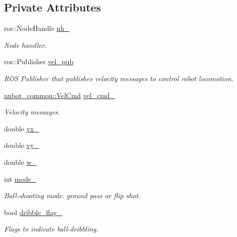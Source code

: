 \subsection*{Private Attributes}
\begin{DoxyCompactItemize}
\item 
ros\-::\-Node\-Handle \hyperlink{classnubot_1_1NubotTeleopKey_aa0685c9872576f6ce3b19b6f467e5cee}{nh\-\_\-}
\begin{DoxyCompactList}\small\item\em Node handler. \end{DoxyCompactList}\item 
ros\-::\-Publisher \hyperlink{classnubot_1_1NubotTeleopKey_af2b940ed562da027c7eda729403e4f86}{vel\-\_\-pub}
\begin{DoxyCompactList}\small\item\em R\-O\-S Publisher that publishes velocity messages to control robot locomotion. \end{DoxyCompactList}\item 
\hyperlink{namespacenubot__common_a7dcbb6e0f9d7827fd3a4c5b347ae3cfa}{nubot\-\_\-common\-::\-Vel\-Cmd} \hyperlink{classnubot_1_1NubotTeleopKey_a7c70e3f5f30f940e9c508deb84f23da5}{vel\-\_\-cmd\-\_\-}
\begin{DoxyCompactList}\small\item\em Velocity messages. \end{DoxyCompactList}\item 
double \hyperlink{classnubot_1_1NubotTeleopKey_aafe296ec15a99f249180144842c64b29}{vx\-\_\-}
\item 
double \hyperlink{classnubot_1_1NubotTeleopKey_a9bd6bb13fc993a07fb3d2272d3e2a600}{vy\-\_\-}
\item 
double \hyperlink{classnubot_1_1NubotTeleopKey_a40143b187fb9f6278b0c2847acd3d756}{w\-\_\-}
\item 
int \hyperlink{classnubot_1_1NubotTeleopKey_a5d4f917773136b83f6ba268f50c8a0ea}{mode\-\_\-}
\begin{DoxyCompactList}\small\item\em Ball-\/shooting mode\-: ground pass or flip shot. \end{DoxyCompactList}\item 
bool \hyperlink{classnubot_1_1NubotTeleopKey_a91a6e9ae14ee91dfa3880ab840d03ca1}{dribble\-\_\-flag\-\_\-}
\begin{DoxyCompactList}\small\item\em Flags to indicate ball-\/dribbling. \end{DoxyCompactList}\item 

\end{DoxyCompactItemize}
